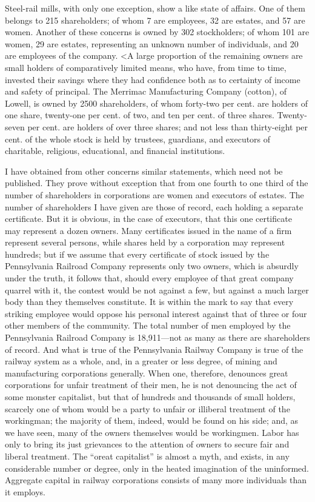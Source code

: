 \documentclass[11pt,openany]{book}
\begin{document}
Steel-rail mills, with only one exception, show a like state of affairs. One of them belongs to 215 shareholders; of whom 7 are employees, 32 are estates, and 57 are women. Another of these concerns is owned by 302 stockholders; of whom 101 are women, 29 are estates, representing an unknown number of individuals, and 20 are employees of the company. <A large proportion of the remaining owners are small holders of comparatively limited means, who have, from time to time, invested their savings where they had confidence both as to certainty of income and safety of principal. The Merrimac Manufacturing Company (cotton), of Lowell, is owned by 2500 shareholders, of whom forty-two per cent. are holders of one share, twenty-one per cent. of two, and ten per cent. of three shares. Twenty-seven per cent. are holders of over three shares; and not less than thirty-eight per cent. of the whole stock is held by trustees, guardians, and executors of charitable, religious, educational, and financial institutions.

I have obtained from other concerns similar statements, which need not be published. They prove without exception that from one fourth to one third of the number of shareholders in corporations are women and executors of estates. The number of shareholders I have given are those of record, each holding a separate certificate. But it is obvious, in the case of executors, that this one certificate may represent a dozen owners. Many certificates issued in the name of a firm represent several persons, while shares held by a corporation may represent hundreds; but if we assume that every certificate of stock issued by the Pennsylvania Railroad Company represents only two owners, which is absurdly under the truth, it follows that, should every employee of that great company quarrel with it, the contest would be not against a few, but against a much larger body than they themselves constitute. It is within the mark to say that every striking employee would oppose his personal interest against that of three or four other members of the community. The total number of men employed by the Pennsylvania Railroad Company is 18,911---not as many as there are shareholders of record. And what is true of the Pennsylvania Railway Company is true of the railway system as a whole, and, in a greater or less degree, of mining and manufacturing corporations generally. When one, therefore, denounces great corporations for unfair treatment of their men, he is not denouncing the act of some monster capitalist, but that of hundreds and thousands of small holders, scarcely one of whom would be a party to unfair or illiberal treatment of the workingman; the majority of them, indeed, would be found on his side; and, as we have seen, many of the owners themselves would be workingmen. Labor has only to bring its just grievances to the attention of owners to secure fair and liberal treatment. The ``oreat capitalist'' is almost a myth, and exists, in any considerable number or degree, only in the heated imagination of the uninformed. Aggregate capital in railway corporations consists of many more individuals than it employs.
\end{document}
